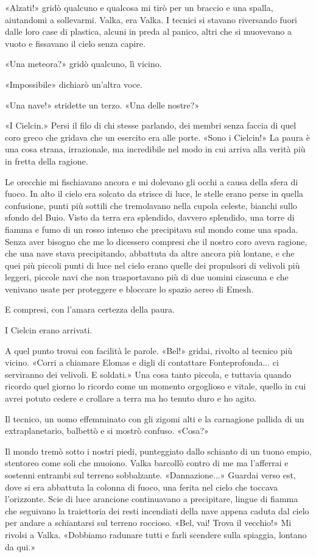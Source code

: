 «Alzati!» gridò qualcuno e qualcosa mi tirò per un braccio e una spalla,
aiutandomi a sollevarmi. Valka, era Valka. I tecnici si stavano
riversando fuori dalle loro case di plastica, alcuni in preda al panico,
altri che si muovevano a vuoto e fissavano il cielo senza capire.

«Una meteora?» gridò qualcuno, lì vicino.

«Impossibile» dichiarò un'altra voce.

«Una nave!» stridette un terzo. «Una delle nostre?»

«I Cielcin.» Persi il filo di chi stesse parlando, dei membri senza
faccia di quel coro greco che gridava che un esercito era alle porte.
«Sono i Cielcin!» La paura è una cosa strana, irrazionale, ma
incredibile nel modo in cui arriva alla verità più in fretta della
ragione.

Le orecchie mi fischiavano ancora e mi dolevano gli occhi a causa della
sfera di fuoco. In alto il cielo era solcato da strisce di luce, le
stelle erano perse in quella confusione, punti più sottili che
tremolavano nella cupola celeste, bianchi sullo sfondo del Buio. Visto
da terra era splendido, davvero splendido, una torre di fiamma e fumo di
un rosso intenso che precipitava sul mondo come una spada. Senza aver
bisogno che me lo dicessero compresi che il nostro coro aveva ragione,
che una nave stava precipitando, abbattuta da altre ancora più lontane,
e che quei più piccoli punti di luce nel cielo erano quelle dei
propulsori di velivoli più leggeri, piccole navi che non trasportavano
più di due uomini ciascuna e che venivano usate per proteggere e
bloccare lo spazio aereo di Emesh.

E compresi, con l'amara certezza della paura.

I Cielcin erano arrivati.

A quel punto trovai con facilità le parole. «Bel!» gridai, rivolto al
tecnico più vicino. «Corri a chiamare Elomas e digli di contattare
Fonteprofonda... ci serviranno dei velivoli. E soldati.» Una cosa tanto
piccola, e tuttavia quando ricordo quel giorno lo ricordo come un
momento orgoglioso e vitale, quello in cui avrei potuto cedere e
crollare a terra ma ho tenuto duro e ho agito.

Il tecnico, un uomo effemminato con gli zigomi alti e la carnagione
pallida di un extraplanetario, balbettò e si mostrò confuso. «Cosa?»

Il mondo tremò sotto i nostri piedi, punteggiato dallo schianto di un
tuono empio, stentoreo come soli che muoiono. Valka barcollò contro di
me ma l'afferrai e sostenni entrambi sul terreno sobbalzante.
«Dannazione...» Guardai verso est, dove si era abbattuta la colonna di
fuoco, una ferita nel cielo che toccava l'orizzonte. Scie di luce
arancione continuavano a precipitare, lingue di fiamma che seguivano la
traiettoria dei resti incendiati della nave appena caduta dal cielo per
andare a schiantarsi sul terreno roccioso. «Bel, vai! Trova il vecchio!»
Mi rivolsi a Valka. «Dobbiamo radunare tutti e farli scendere sulla
spiaggia, lontano da qui.»

